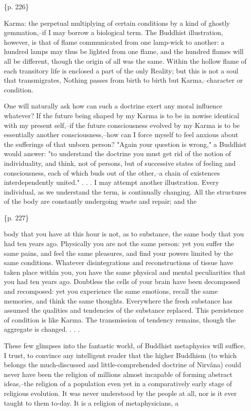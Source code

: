 \{p. 226\}

Karma: the perpetual multiplying of certain conditions by a kind of ghostly gemmation,--if I may borrow a biological term. The Buddhist illustration, however, is that of flame communicated from one lamp-wick to another: a hundred lamps may thus be lighted from one flame, and the hundred flames will all be different, though the origin of all was the same. Within the hollow flame of each transitory life is enclosed a part of the only Reality; but this is not a soul that transmigrates, Nothing passes from birth to birth but Karma,--character or condition.

One will naturally ask how can such a doctrine exert any moral influence whatever? If the future being shaped by my Karma is to be in nowise identical with my present self,--if the future consciousness evolved by my Karma is to be essentially another consciousness,--how can I force myself to feel anxious about the sufferings of that unborn person? "Again your question is wrong," a Buddhist would answer: "to understand the doctrine you must get rid of the notion of individuality, and think, not of persons, but of successive states of feeling and consciousness, each of which buds out of the other,--a chain of existences interdependently united." . . . I may attempt another illustration. Every individual, as we understand the term, is continually changing. All the structures of the body are constantly undergoing waste and repair; and the

\{p. 227\}

body that you have at this hour is not, as to substance, the same body that you had ten years ago. Physically you are not the same person: yet you suffer the same pains, and feel the same pleasures, and find your powers limited by the same conditions. Whatever disintegrations and reconstructions of tissue have taken place within you, you have the same physical and mental peculiarities that you had ten years ago. Doubtless the cells of your brain have been decomposed and recomposed: yet you experience the same emotions, recall the same memories, and think the same thoughts. Everywhere the fresh substance has assumed the qualities and tendencies of the substance replaced. This persistence of condition is like Karma. The transmission of tendency remains, though the aggregate is changed. . . .



These few glimpses into the fantastic world, of Buddhist metaphysics will suffice, I trust, to convince any intelligent reader that the higher Buddhism (to which belongs the much-discussed and little-comprehended doctrine of Nirvâna) could never have been the religion of millions almost incapable of forming abstract ideas,--the religion of a population even yet in a comparatively early stage of religious evolution. It was never understood by the people at all, nor is it ever taught to them to-day. It is a religion of metaphysicians, a

